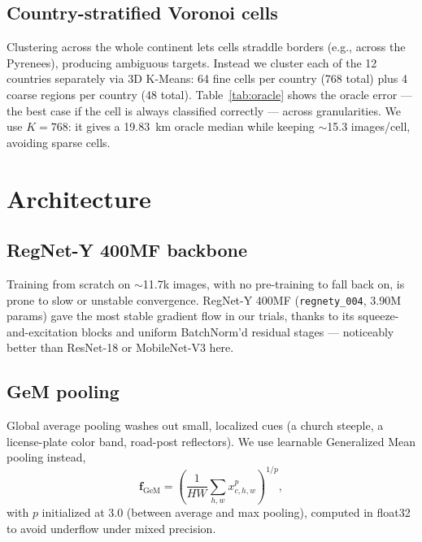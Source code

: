 \documentclass[10pt,twocolumn,a4paper]{article}
\begin{document}
\subsection{Country-stratified Voronoi cells}
Clustering across the whole continent lets cells straddle borders (e.g., across the Pyrenees), producing ambiguous targets. Instead we cluster each of the 12 countries separately via 3D K-Means: 64 fine cells per country (768 total) plus 4 coarse regions per country (48 total). Table~\ref{tab:oracle} shows the oracle error — the best case if the cell is always classified correctly — across granularities. We use $K=768$: it gives a 19.83~km oracle median while keeping $\sim$15.3 images/cell, avoiding sparse cells.

\begin{table}[t]
\centering
\small
\caption{Oracle Haversine error vs.\ cell count}
\label{tab:oracle}
\end{table}

\section{Architecture}
\subsection{RegNet-Y 400MF backbone}
Training from scratch on $\sim$11.7k images, with no pre-training to fall back on, is prone to slow or unstable convergence. RegNet-Y 400MF (\texttt{regnety\_004}, 3.90M params) gave the most stable gradient flow in our trials, thanks to its squeeze-and-excitation blocks and uniform BatchNorm'd residual stages — noticeably better than ResNet-18 or MobileNet-V3 here.

\subsection{GeM pooling}
Global average pooling washes out small, localized cues (a church steeple, a license-plate color band, road-post reflectors). We use learnable Generalized Mean pooling instead,
\begin{equation}
\mathbf{f}_{\text{GeM}} = \left( \frac{1}{HW} \sum_{h,w} x_{c,h,w}^p \right)^{1/p},
\end{equation}
with $p$ initialized at 3.0 (between average and max pooling), computed in float32 to avoid underflow under mixed precision.
\end{document}

